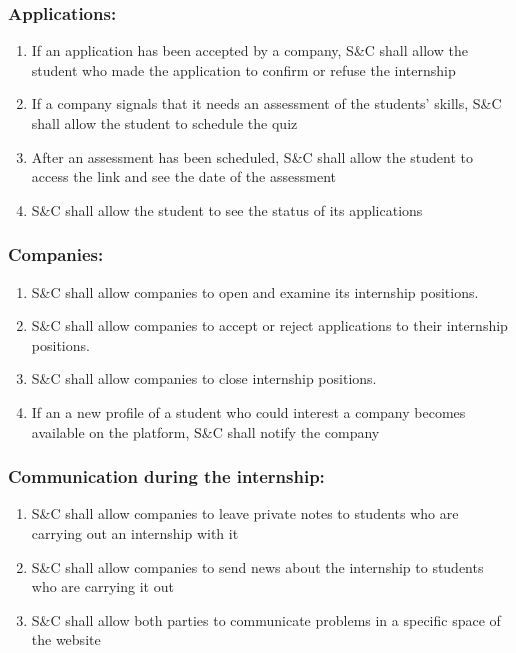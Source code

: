     \subsubsection*{Applications:}
        \begin{enumerate}[label=\textbf{R\arabic*},resume]
            \item If an application has been accepted by a company, S\&C shall allow the student who made the application to confirm or refuse the internship
            \item If a company signals that it needs an assessment of the students' skills, S\&C shall allow the student to schedule the quiz
            \item After an assessment has been scheduled, S\&C shall allow the student to access the link and see the date of the assessment
            \item S\&C shall allow the student to see the status of its applications
        \end{enumerate}
    
    \subsubsection*{Companies:}
        \begin{enumerate}[label=\textbf{R\arabic*},resume]
            \item S\&C shall allow companies to open and examine its internship positions.
            \item S\&C shall allow companies to accept or reject applications to their internship positions.
            \item S\&C shall allow companies to close internship positions.
            \item If an a new profile of a student who could interest a company becomes available on the platform, S\&C shall notify the company
        \end{enumerate}
    
    \subsubsection*{Communication during the internship:}
         \begin{enumerate}[label=\textbf{R\arabic*},resume]
            \item S\&C shall allow companies to leave private notes to students who are carrying out an internship with it
            \item S\&C shall allow companies to send news about the internship to students who are carrying it out
            \item S\&C shall allow both parties to communicate problems in a specific space of the website
        \end{enumerate}
    
